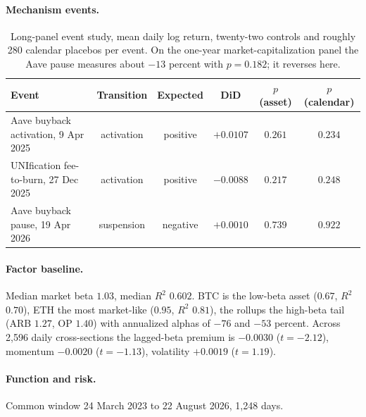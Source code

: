 \documentclass[10pt]{article}
\begin{document}
\paragraph{Mechanism events.}
\begin{table}[ht]
\centering
\small
\begin{tabular}{lccccc}
\toprule
Event & Transition & Expected & DiD & $p$ (asset) & $p$ (calendar) \\
\midrule
Aave buyback activation, 9 Apr 2025 & activation & positive & $+0.0107$ & $0.261$ & $0.234$ \\
UNIfication fee-to-burn, 27 Dec 2025 & activation & positive & $-0.0088$ & $0.217$ & $0.248$ \\
Aave buyback pause, 19 Apr 2026 & suspension & negative & $+0.0010$ & $0.739$ & $0.922$ \\
\bottomrule
\end{tabular}
\caption{Long-panel event study, mean daily log return, twenty-two controls and roughly 280 calendar placebos per event. On the one-year market-capitalization panel the Aave pause measures about $-13$ percent with $p = 0.182$; it reverses here.}
\end{table}

\paragraph{Factor baseline.} Median market beta $1.03$, median $R^2$ $0.602$. BTC is the low-beta asset ($0.67$, $R^2$ $0.70$), ETH the most market-like ($0.95$, $R^2$ $0.81$), the rollups the high-beta tail (ARB $1.27$, OP $1.40$) with annualized alphas of $-76$ and $-53$ percent. Across 2,596 daily cross-sections the lagged-beta premium is $-0.0030$ ($t = -2.12$), momentum $-0.0020$ ($t = -1.13$), volatility $+0.0019$ ($t = 1.19$).

\paragraph{Function and risk.} Common window 24 March 2023 to 22 August 2026, 1,248 days.
\end{document}
